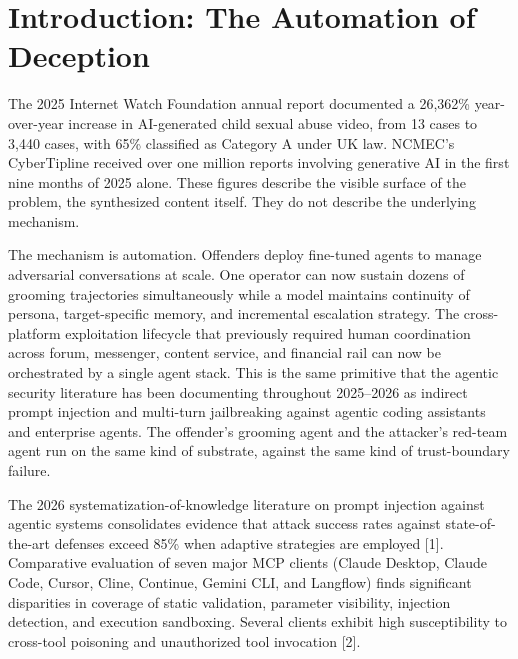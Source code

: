 \documentclass[11pt]{article}
\begin{document}
\section{Introduction: The Automation of Deception}
\label{sec:intro}

The 2025 Internet Watch Foundation annual report documented a 26{,}362\% year-over-year increase in AI-generated child sexual abuse video, from 13 cases to 3{,}440 cases, with 65\% classified as Category A under UK law. NCMEC's CyberTipline received over one million reports involving generative AI in the first nine months of 2025 alone. These figures describe the visible surface of the problem, the synthesized content itself. They do not describe the underlying mechanism.

The mechanism is automation. Offenders deploy fine-tuned agents to manage adversarial conversations at scale. One operator can now sustain dozens of grooming trajectories simultaneously while a model maintains continuity of persona, target-specific memory, and incremental escalation strategy. The cross-platform exploitation lifecycle that previously required human coordination across forum, messenger, content service, and financial rail can now be orchestrated by a single agent stack. This is the same primitive that the agentic security literature has been documenting throughout 2025--2026 as indirect prompt injection and multi-turn jailbreaking against agentic coding assistants and enterprise agents. The offender's grooming agent and the attacker's red-team agent run on the same kind of substrate, against the same kind of trust-boundary failure.

The 2026 systematization-of-knowledge literature on prompt injection against agentic systems consolidates evidence that attack success rates against state-of-the-art defenses exceed 85\% when adaptive strategies are employed [1]. Comparative evaluation of seven major MCP clients (Claude Desktop, Claude Code, Cursor, Cline, Continue, Gemini CLI, and Langflow) finds significant disparities in coverage of static validation, parameter visibility, injection detection, and execution sandboxing. Several clients exhibit high susceptibility to cross-tool poisoning and unauthorized tool invocation [2].
\end{document}
